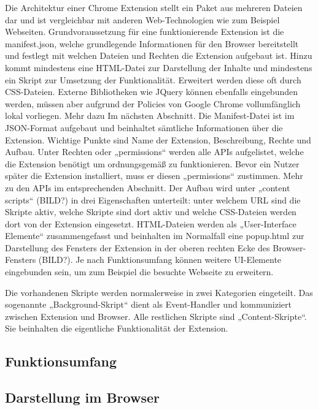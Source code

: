 Die Architektur einer Chrome Extension stellt ein Paket aus mehreren Dateien dar und ist vergleichbar mit anderen Web-Technologien wie zum Beispiel Webseiten.
Grundvoraussetzung für eine funktionierende Extension ist die manifest.json, welche grundlegende Informationen für den Browser bereitstellt und festlegt mit welchen Dateien und Rechten die Extension aufgebaut ist. Hinzu kommt mindestens eine HTML-Datei zur Darstellung der Inhalte und mindestens ein Skript zur Umsetzung der Funktionalität. Erweitert werden diese oft durch CSS-Dateien.
Externe Bibliotheken wie JQuery können ebenfalls eingebunden werden, müssen aber aufgrund der Policies von Google Chrome vollumfänglich lokal vorliegen. Mehr dazu Im nächsten Abschnitt.
Die Manifest-Datei ist im JSON-Format aufgebaut und beinhaltet sämtliche Informationen über die Extension. Wichtige Punkte sind Name der Extension, Beschreibung, Rechte und Aufbau. Unter Rechten oder „permissions“ werden alle APIs aufgelistet, welche die Extension benötigt um ordnungsgemäß zu funktionieren. Bevor ein Nutzer später die Extension installiert, muss er diesen „permissions“ zustimmen. Mehr zu den APIs im entsprechenden Abschnitt.
Der Aufbau wird unter „content scripts“ (BILD?) in drei Eigenschaften unterteilt: unter welchem URL sind die Skripte aktiv, welche Skripte sind dort aktiv und welche CSS-Dateien werden dort von der Extension eingesetzt.
HTML-Dateien werden als „User-Interface Elemente“ zusammengefasst und beinhalten im Normalfall eine popup.html zur Darstellung des Fensters der Extension in der oberen rechten Ecke des Browser-Fensters (BILD?). Je nach Funktionsumfang können weitere UI-Elemente eingebunden sein, um zum Beispiel die besuchte Webseite zu erweitern.

Die vorhandenen Skripte werden normalerweise in zwei Kategorien eingeteilt. Das sogenannte „Background-Skript“ dient als Event-Handler und kommuniziert zwischen Extension und Browser. Alle restlichen Skripte sind „Content-Skripte“. Sie beinhalten die eigentliche Funktionalität der Extension. 

\subsection{Funktionsumfang}
\label{ss:funktionsumfang}

\subsection{Darstellung im Browser}
\label{ss:darstellung}


